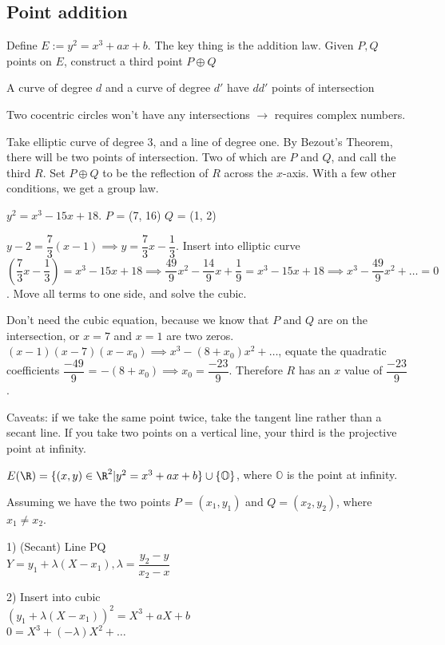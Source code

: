 \documentclass[twoside, 10pt]{article}
\renewcommand{\O}{\mathbb{O}}
\begin{document}
\subsection{Point addition}
Define $E := y^2 = x^3 + ax + b$. The key thing is the addition law. Given $P, Q$ points on $E$, construct a third point $P \oplus Q$

\begin{thm}
    A curve of degree $d$ and a curve of degree $d'$ have $dd'$ points of intersection
\end{thm}
Two cocentric circles won't have any intersections $\to$ requires complex numbers. 

Take elliptic curve of degree 3, and a line of degree one. By Bezout's Theorem, there will be two points of intersection. Two of which are $P$ and $Q$, and call the third $R$. Set $P \oplus Q$ to be the reflection of $R$ across the $x$-axis. With a few other conditions, we get a group law.

\begin{exm*}
    $y^2 = x^3 - 15x + 18$. $P$ = (7, 16) $Q$ = (1, 2)
\end{exm*}
$y - 2 = \dfrac{7}{3}(x-1) \implies y = \dfrac{7}{3}x - \dfrac{1}{3}$. Insert into elliptic curve $(\dfrac{7}{3}x - \dfrac{1}{3}) = x^3 - 15x + 18 \implies \dfrac{49}{9}x^2 - \dfrac{14}{9}x + \dfrac{1}{9} = x^3 - 15x + 18 \implies x^3 - \dfrac{49}{9}x^2 + \ldots = 0$. Move all terms to one side, and solve the cubic. 

Don't need the cubic equation, because we know that $P$ and $Q$ are on the intersection, or $x = 7$ and $x = 1$ are two zeros. $(x - 1)(x - 7)(x - x_0) \implies x^3 - (8 + x_0)x^2 + \ldots$, equate the quadratic coefficients $\dfrac{-49}{9}$ = $-(8 + x_0) \implies x_0 = \dfrac{-23}{9}$. Therefore $R$ has an $x$ value of $\dfrac{-23}{9}$. 

Caveats: if we take the same point twice, take the tangent line rather than a secant line. If you take two points on a vertical line, your third is the projective point at infinity.

$E(\R) = \{(x, y) \in \R^2 | y^2 = x^3 + ax + b\} \cup \{\O\}$, where $\O$ is the point at infinity.

Assuming we have the two points $P = (x_1, y_1)$ and $Q = (x_2, y_2)$, where $x_1 \neq x_2$.

1) (Secant) Line PQ\\
$Y = y_1 + \lambda(X - x_1), \lambda = \dfrac{y_2 - y}{x_2 - x}$

2) Insert into cubic\\
$(y_1 + \lambda(X - x_1))^2 = X^3 + aX + b$\\
$0 = X^3 + (-\lambda)X^2 + \ldots$
\end{document}
